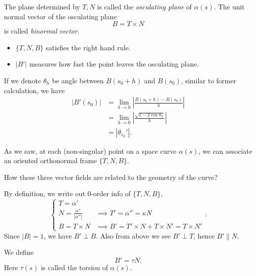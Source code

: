 \begin{definition}
The plane determined by \(T,N\) is called the \emph{osculating plane} of
\(\alpha(s)\). The unit normal vector of the osculating plane
\[
    B=T\times N
\] is called \emph{binormal vector}.
\end{definition}
\begin{remark}\hfill
\begin{itemize}
    \item \(\{T,N,B\}\) satisfies the right hand rule.
    \item \(|B'|\) measures how fast the point leaves the osculating plane.
\end{itemize}
If we denote \(\theta_h\) be angle between \(B(s_0+h)\) and \(B(s_0)\), similar to
former calculation, we have
\begin{align*}
    |B'(s_0)|&= \lim_{h \to 0} \left|\frac{B(s_0+h)-B(s_0)}{h}\right| \\
    &= \lim_{h \to 0} \left|\frac{\sqrt{2-2\cos\theta_h}}{h}\right| \\
    &= |\theta_{s_0}'|
.\end{align*}
\end{remark}

As we saw, at each (non-singular) point on a space curve \(\alpha(s)\), we can
associate an oriented orthonormal frame \(\{T,N,B\}\).
\begin{question}
    How these three vector fields are related to the geometry of the curve?
\end{question}
By definition, we write out 0-order info of \(\{T,N,B\}\), \ie\ \[
    \begin{cases}
        T=\alpha' & \\
        N=\frac{\alpha''}{|\alpha''|} & \implies T'=\alpha''=\kappa N \\
        B=T\times N & \implies B'=T'\times N+T\times N'=T\times N'
    \end{cases}
.\] Since \(|B|=1\), we have \(B'\perp B\). Also from above we see \(B'\perp T\),
hence \(B'\parallel N\).
\begin{definition}
    We define \[
        B'=\tau N
    .\] Here \(\tau(s)\) is called the torsion of \(\alpha(s)\).
\end{definition}

